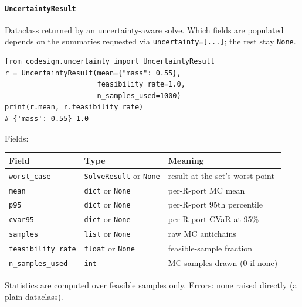 \documentclass[11pt,a4paper]{article}
\begin{document}
\paragraph{\texttt{UncertaintyResult}}\label{ref:uncertainty:uncertaintyresult}
Dataclass returned by an uncertainty-aware solve. Which fields are populated
depends on the summaries requested via \texttt{uncertainty=[...]}; the rest
stay \texttt{None}.
\begin{lstlisting}
from codesign.uncertainty import UncertaintyResult
r = UncertaintyResult(mean={"mass": 0.55},
                      feasibility_rate=1.0,
                      n_samples_used=1000)
print(r.mean, r.feasibility_rate)
# {'mass': 0.55} 1.0
\end{lstlisting}
Fields:
\begin{center}
\begin{tabular}{@{}lll@{}}
\toprule
Field & Type & Meaning \\
\midrule
\texttt{worst\_case} & \texttt{SolveResult} or \texttt{None} & result at the
  set's worst point \\
\texttt{mean} & \texttt{dict} or \texttt{None} & per-R-port MC mean \\
\texttt{p95} & \texttt{dict} or \texttt{None} & per-R-port 95th percentile \\
\texttt{cvar95} & \texttt{dict} or \texttt{None} & per-R-port CVaR at 95\% \\
\texttt{samples} & \texttt{list} or \texttt{None} & raw MC antichains \\
\texttt{feasibility\_rate} & \texttt{float} or \texttt{None} & feasible-sample
  fraction \\
\texttt{n\_samples\_used} & \texttt{int} & MC samples drawn (0 if none) \\
\bottomrule
\end{tabular}
\end{center}
Statistics are computed over feasible samples only. Errors: none raised
directly (a plain dataclass).
\end{document}
